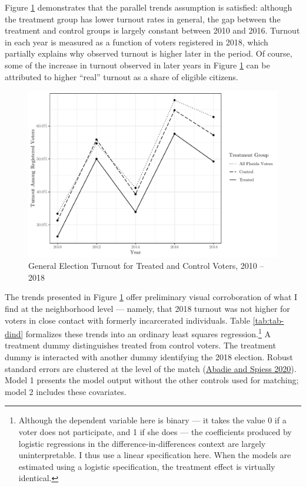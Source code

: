 \documentclass[
  12pt,
]{article}
\begin{document}
Figure \ref{fig:dind} demonstrates that the parallel trends assumption is satisfied: although the treatment group has lower turnout rates in general, the gap between the treatment and control groups is largely constant between 2010 and 2016. Turnout in each year is measured as a function of voters registered in 2018, which partially explains why observed turnout is higher later in the period. Of course, some of the increase in turnout observed in later years in Figure \ref{fig:dind} can be attributed to higher ``real'' turnout as a share of eligible citizens.

\begin{figure}[H]

{\centering \includegraphics{figure4_dind} 

}

\caption{\label{fig:dind}General Election Turnout for Treated and Control Voters, 2010 -- 2018}\label{fig:dind}
\end{figure}

The trends presented in Figure \ref{fig:dind} offer preliminary visual corroboration of what I find at the neighborhood level --- namely, that 2018 turnout was not higher for voters in close contact with formerly incarcerated individuals. Table \ref{tab:tab-dind} formalizes these trends into an ordinary least squares regression.\footnote{Although the dependent variable here is binary --- it takes the value 0 if a voter does not participate, and 1 if she does --- the coefficients produced by logistic regressions in the difference-in-differences context are largely uninterpretable. I thus use a linear specification here. When the models are estimated using a logistic specification, the treatment effect is virtually identical.} A treatment dummy distinguishes treated from control voters. The treatment dummy is interacted with another dummy identifying the 2018 election. Robust standard errors are clustered at the level of the match (\protect\hyperlink{ref-Abadie2020}{Abadie and Spiess 2020}). Model 1 presents the model output without the other controls used for matching; model 2 includes these covariates.
\end{document}
